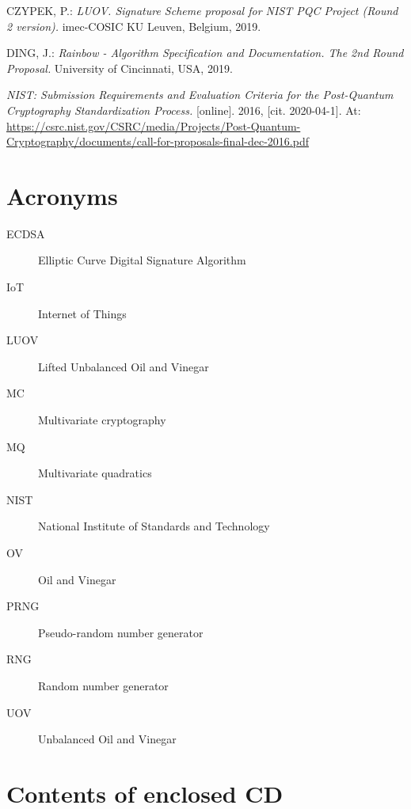 \documentclass[thesis=M,english]{FITthesis}[2019/12/23]
\begin{document}
\begin{thebibliography}{9}
CZYPEK, P.: \textit{LUOV. Signature Scheme proposal for NIST PQC Project (Round 2 version).} imec-COSIC KU Leuven, Belgium, 2019.

DING, J.: \textit{Rainbow - Algorithm Specification and Documentation. The 2nd Round Proposal.} University of Cincinnati, USA, 2019.

\textit{NIST: Submission Requirements and Evaluation Criteria for the Post-Quantum Cryptography Standardization Process.} [online]. 2016, [cit. 2020-04-1]. At: \url{https://csrc.nist.gov/CSRC/media/Projects/Post-Quantum-Cryptography/documents/call-for-proposals-final-dec-2016.pdf}

\end{thebibliography}
\appendix

\chapter{Acronyms}
\begin{description}
	\item[ECDSA] Elliptic Curve Digital Signature Algorithm
	\item[IoT] Internet of Things
	\item[LUOV] Lifted Unbalanced Oil and Vinegar
	\item[MC] Multivariate cryptography
	\item[MQ] Multivariate quadratics
	\item[NIST] National Institute of Standards and Technology
	\item[OV] Oil and Vinegar
	\item[PRNG] Pseudo-random number generator
	\item[RNG] Random number generator
	\item[UOV] Unbalanced Oil and Vinegar	
\end{description}


\chapter{Contents of enclosed CD}


\begin{figure}
\end{figure}
\end{document}
